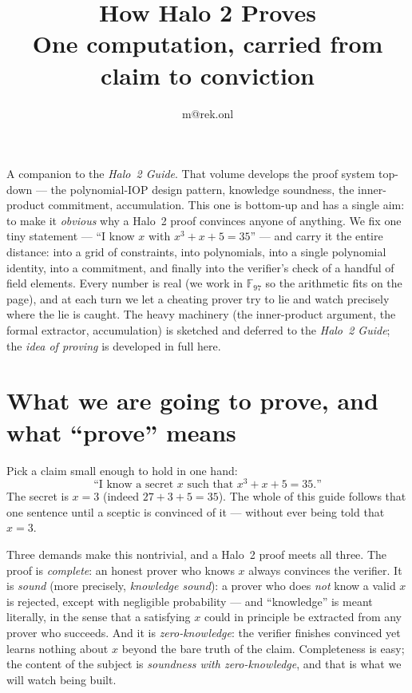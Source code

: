 \documentclass[11pt,a4paper]{article}
\title{\textbf{\Huge How Halo 2 Proves}\\[6pt]\large One computation, carried from claim to conviction}
\author{m@rek.onl}
\date{}
\theoremstyle{definition}
\newcommand{\F}{\mathbb{F}}
\renewenvironment{abstract}{%
  \small\begin{center}{\bfseries\abstractname}\end{center}\medskip\noindent\ignorespaces
}{\par\medskip}
\begin{document}
\maketitle
\thispagestyle{empty}
\begin{abstract}
A companion to the \emph{Halo~2 Guide}. That volume develops the proof system
top-down --- the polynomial-IOP design pattern, knowledge soundness, the
inner-product commitment, accumulation. This one is bottom-up and has a single
aim: to make it \emph{obvious} why a Halo~2 proof convinces anyone of anything.
We fix one tiny statement --- ``I know $x$ with $x^3 + x + 5 = 35$'' --- and
carry it the entire distance: into a grid of constraints, into polynomials,
into a single polynomial identity, into a commitment, and finally into the
verifier's check of a handful of field elements. Every number is real
(we work in $\F_{97}$ so the arithmetic fits on the page), and at each turn we
let a cheating prover try to lie and watch precisely where the lie is caught.
The heavy machinery (the inner-product argument, the formal extractor,
accumulation) is sketched and deferred to the \emph{Halo~2 Guide}; the
\emph{idea of proving} is developed in full here.
\end{abstract}
\clearpage
\tableofcontents
\clearpage

\section{What we are going to prove, and what ``prove'' means}\label{sec:intro}

Pick a claim small enough to hold in one hand:
\[
\text{``I know a secret } x \text{ such that } x^3 + x + 5 = 35\text{.''}
\]
The secret is $x = 3$ (indeed $27 + 3 + 5 = 35$). The whole of this guide
follows that one sentence until a sceptic is convinced of it --- without ever
being told that $x = 3$.

Three demands make this nontrivial, and a Halo~2 proof meets all three. The
proof is \emph{complete}: an honest prover who knows $x$ always convinces the
verifier. It is \emph{sound} (more precisely, \emph{knowledge sound}): a prover
who does \emph{not} know a valid $x$ is rejected, except with negligible
probability --- and ``knowledge'' is meant literally, in the sense that a
satisfying $x$ could in principle be extracted from any prover who succeeds.
And it is \emph{zero-knowledge}: the verifier finishes convinced yet learns
nothing about $x$ beyond the bare truth of the claim. Completeness is easy;
the content of the subject is \emph{soundness with zero-knowledge}, and that is
what we will watch being built.
\end{document}
